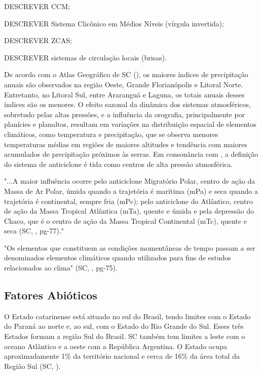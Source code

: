 DESCREVER \acrlong{CCM};

DESCREVER Sistema Clicônico em Médios Níveis (vírgula invertida);

DESCREVER \acrlong{ZCAS};

DESCREVER  sistemas de circulação locais (brisas).

\indent De acordo com o Atlas Geográfico de \acrlong{SC} (\citeyear{AtlasSCnatureza}), os maiores índices de precipitação anuais são observados na região Oeste, Grande Florianópolis e Litoral Norte. Entretanto, no Litoral Sul, entre Araranguá e Laguna, os totais anuais desses índices são os menores. O efeito sazonal da dinâmica dos sistemas atmosféricos, sobretudo pelas altas pressões, e a influência da orografia, principalmente por planícies e planaltos, resultam em variações na distribuição espacial de elementos climáticos, como temperatura e precipitação, que se observa menores temperaturas médias em regiões de maiores altitudes e tendência com maiores acumulados de precipitação próximos às serras. Em consonância com , a definição do sistema de anticiclone é tida como centros de alta pressão atmosférica.

\begin{citacao}
"...A maior influência ocorre pelo anticiclone Migratório Polar, centro de ação da Massa de Ar Polar, úmida quando a trajetória é marítima (mPa) e seca quando a trajetória é continental, sempre fria (mPc); pelo anticiclone do Atlântico, centro de ação da Massa Tropical Atlântica (mTa), quente e úmida e pela depressão do Chaco, que é o centro de ação da Massa Tropical Continental (mTc), quente e seca (\acrlong{SC}, \citeyear{AtlasSCnatureza}, pg-77)." 
\end{citacao}

\indent "Os elementos que constituem as condições momentâneas de tempo passam a ser denominados elementos climáticos quando utilizados para fins de estudos relacionados ao clima" (\acrlong{SC}, \citeyear{AtlasSCnatureza}, pg-75).


\subsection{Fatores Abióticos}

O Estado catarinense está situado no sul do Brasil, tendo limites com o Estado do Paraná ao norte e, ao sul, com o Estado do Rio Grande do Sul. Esses três Estados  formam a região Sul do Brasil. \acrlong{SC} também tem limites a leste com o oceano Atlântico e a oeste com a República Argentina.  O Estado ocupa aproximadamente 1\% da território nacional e  cerca de 16\% da área total da Região Sul (\acrlong{SC}, \citeyear{AtlasSCterritorio}).

